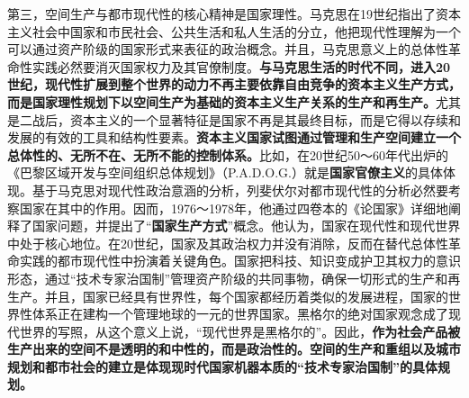 \documentclass[UTF8, fontset = sourcesans, a4paper, oneside, zihao =
-4, scheme=chinese, no-math, space=true]{ctexbook}
\begin{document}
第三，空间生产与都市现代性的核心精神是国家理性。马克思在19世纪指出了资本主义社会中国家和市民社会、公共生活和私人生活的分立，他把现代性理解为一个可以通过资产阶级的国家形式来表征的政治概念。并且，马克思意义上的总体性革命性实践必然要消灭国家权力及其官僚制度。\textbf{与马克思生活的时代不同，进入20世纪，现代性扩展到整个世界的动力不再主要依靠自由竞争的资本主义生产方式，而是国家理性规划下以空间生产为基础的资本主义生产关系的生产和再生产。}尤其是二战后，资本主义的一个显著特征是国家不再是其最终目标，而是它得以存续和发展的有效的工具和结构性要素。\textbf{资本主义国家试图通过管理和生产空间建立一个总体性的、无所不在、无所不能的控制体系。}比如，在20世纪50～60年代出炉的《巴黎区域开发与空间组织总体规划》（P.A.D.O.G.）就是\textbf{国家官僚主义}的具体体现。基于马克思对现代性政治意涵的分析，列斐伏尔对都市现代性的分析必然要考察国家在其中的作用。因而，1976～1978年，他通过四卷本的《论国家》详细地阐释了国家问题，并提出了``\textbf{国家生产方式}''概念。他认为，国家在现代性和现代世界中处于核心地位。在20世纪，国家及其政治权力并没有消除，反而在替代总体性革命实践的都市现代性中扮演着关键角色。国家把科技、知识变成护卫其权力的意识形态，通过``技术专家治国制''管理资产阶级的共同事物，确保一切形式的生产和再生产。并且，国家已经具有世界性，每个国家都经历着类似的发展进程，国家的世界性体系正在建构一个管理地球的一元的世界国家。黑格尔的绝对国家观念成了现代世界的写照，从这个意义上说，``现代世界是黑格尔的''。因此，\textbf{作为社会产品被生产出来的空间不是透明的和中性的，而是政治性的。空间的生产和重组以及城市规划和都市社会的建立是体现现时代国家机器本质的``技术专家治国制''的具体规划。}
\end{document}
